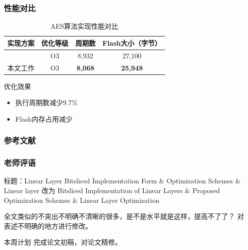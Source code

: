 \documentclass{beamer}
\begin{document}
\begin{frame}
    \frametitle{性能对比}
    \begin{table}
        \centering
        \caption{AES算法实现性能对比}
        \begin{tabular}{lccc}
            \toprule
            实现方案 & 优化等级 & 周期数 & Flash大小（字节） \\
            \midrule
            \cite{Schwabe2016} & O3 & 8,932 & 27,100 \\
            本文工作 & O3 & \textbf{8,068} & \textbf{25,948} \\
            \bottomrule
        \end{tabular}
    \end{table}
    
    \begin{block}{优化效果}
        \begin{itemize}
            \item 执行周期数减少9.7\%
            \item Flash内存占用减少
        \end{itemize}
    \end{block}
\end{frame}

\begin{frame}[allowframebreaks]
    \frametitle{参考文献}
    
\end{frame}

\begin{frame}
    \frametitle{老师评语}
    \begin{block}{标题：Linear Layer Bitsliced Implementation Form \& Optimization Schemes \& Linear layer}
        改为 Bitsliced Implementation of Linear Layers \& Proposed Optimization Schemes \& Linear Layer Optimization
    \end{block}

    \begin{block}{全文类似的不突出不明确不清晰的很多，是不是水平就是这样，提高不了了？}
        对表述不明确的地方进行修改。
    \end{block}
    \begin{alertblock}{本周计划}
        完成论文初稿，对论文精修。
    \end{alertblock}
\end{frame}
\end{document}
